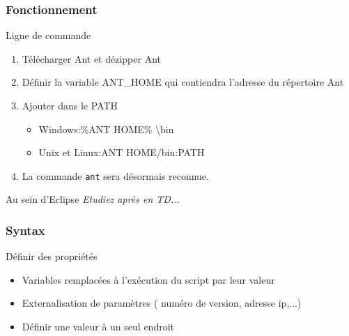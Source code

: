 \documentclass[handout]{beamer}
\begin{document}
\subsubsection{Fonctionnement}
\begin{frame}
  	\begin{block}{Ligne de commande}
		\begin{enumerate}
			\item Télécharger Ant et dézipper Ant
			\item Définir la variable ANT\_HOME qui contiendra l'adresse du répertoire Ant
			\item Ajouter dans le PATH 
			\begin{itemize}
 				\item Windows:\%ANT \textunderscore HOME\% \textbackslash bin
				\item Unix et Linux:\textdollar \textbraceleft ANT \textunderscore HOME\textbraceright /bin:\textbraceleft PATH\textbraceright
			\end{itemize}
			\item La commande \texttt{ant} sera désormais reconnue.
		\end{enumerate}
  	\end{block}

 	\begin{block}{Au sein d'Eclipse}
 	 	\textit{Etudiez après en TD...}
 	\end{block}
\end{frame}

\subsubsection{Syntax}
\begin{frame}
	\begin{block}{Définir des propriétés}
		\begin{itemize}
			\item Variables remplacées à l'exécution du script par leur valeur
			\item Externalisation de paramètres ( numéro de version, adresse ip,...)
			\item Définir une valeur à un seul endroit
		\end{itemize}
		
	\end{block}
\end{frame}
\end{document}

